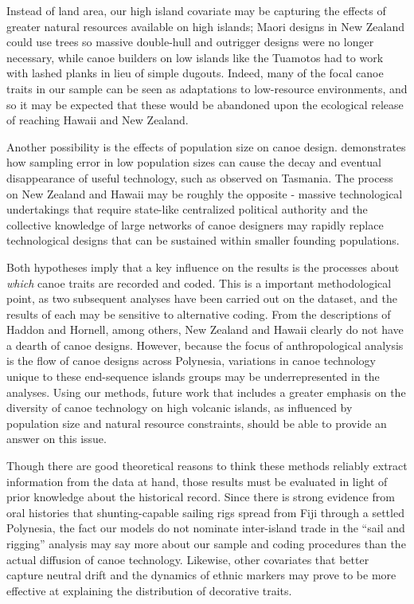 \documentclass[11pt]{article}
\begin{document}
Instead of land area, our high island covariate may be capturing the effects of greater natural resources available on high islands; Maori designs in New Zealand could use trees so massive double-hull and outrigger designs were no longer necessary, while canoe builders on low islands like the Tuamotos had to work with lashed planks in lieu of simple dugouts. Indeed, many of the focal canoe traits in our sample can be seen as adaptations to low-resource environments, and so it may be expected that these would be abandoned upon the ecological release of reaching Hawaii and New Zealand. 

Another possibility is the effects of population size on canoe design. \cite{Henrich2004:Tasmania} demonstrates how sampling error in low population sizes can cause the decay and eventual disappearance of useful technology, such as observed on Tasmania. The process on New Zealand and Hawaii may be roughly the opposite - massive technological undertakings that require state-like centralized political authority and the collective knowledge of large networks of canoe designers may rapidly replace technological designs that can be sustained within smaller founding populations. 

Both hypotheses imply that a key influence on the results is the processes about \textit{which} canoe traits are recorded and coded. This is a important methodological point, as two subsequent analyses \citep{RogersFeldmanEhrlich2009,GrayBryantGreenhill2010} have been carried out on the \cite{Rogers2008:Canoes} dataset, and the results of each may be sensitive to alternative coding. From the descriptions of Haddon and Hornell, among others, New Zealand and Hawaii clearly do not have a dearth of canoe designs. However, because the focus of anthropological analysis is the flow of canoe designs across Polynesia, variations in canoe technology unique to these end-sequence islands groups may be underrepresented in the analyses. Using our methods, future work that includes a greater emphasis on the diversity of canoe technology on high volcanic islands, as influenced by population size and natural resource constraints, should be able to provide an answer on this issue.

Though there are good theoretical reasons to think these methods reliably extract information from the data at hand, those results must be evaluated in light of prior knowledge about the historical record. Since there is strong evidence from oral histories that shunting-capable sailing rigs spread from Fiji through a settled Polynesia, the fact our models do not nominate inter-island trade in the ``sail and rigging'' analysis may say more about our sample and coding procedures than the actual diffusion of canoe technology. Likewise, other covariates that better capture neutral drift and the dynamics of ethnic markers may prove to be more effective at explaining the distribution of decorative traits. 
\end{document}
